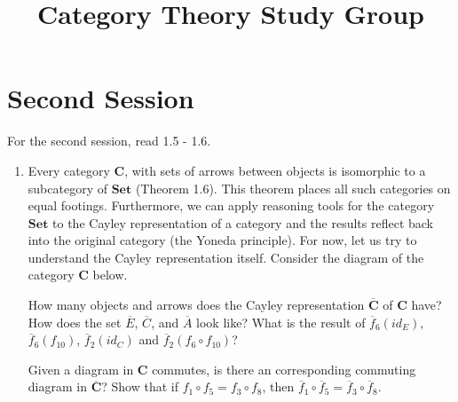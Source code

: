 \documentclass{scrartcl}
\title{Category Theory Study Group}
\date{}
\newcommand{\Cat}[1]{\mathbf{#1}}
\begin{document}
\maketitle

\section*{Second Session}
For the second session, read 1.5 - 1.6.

\begin{enumerate}

\item \label{ex:cayley}
  Every category $\Cat{C}$, with sets of arrows between objects is isomorphic to a subcategory of $\Cat{Set}$ (Theorem 1.6).
  This theorem places all such categories on equal footings.
  Furthermore, we can apply reasoning tools for the category $\Cat{Set}$ to the Cayley representation of a category and the results reflect back into the original category (the Yoneda principle).
  For now, let us try to understand the Cayley representation itself.
  Consider the diagram of the category $\Cat{C}$ below.
  \begin{center}
  \end{center}
  How many objects and arrows does the Cayley representation $\overline{\Cat{C}}$ of $\Cat{C}$ have?
  How does the set $\overline{E}$, $\overline{C}$, and $\overline{A}$ look like?
  What is the result of $\overline{f}_6(\mathit{id}_E)$, $\overline{f}_6(f_{10})$, $\overline{f}_2(\mathit{id}_C)$ and $\overline{f}_2(f_6 \circ f_{10})$?

  Given a diagram in $\Cat{C}$ commutes, is there an corresponding commuting diagram in $\overline{\mathbf{C}}$?
  Show that if $f_1 \circ f_5 = f_3 \circ f_8$, then $\overline{f}_1 \circ \overline{f}_5 = \overline{f}_3 \circ \overline{f}_8$.


\end{enumerate}
\end{document}
